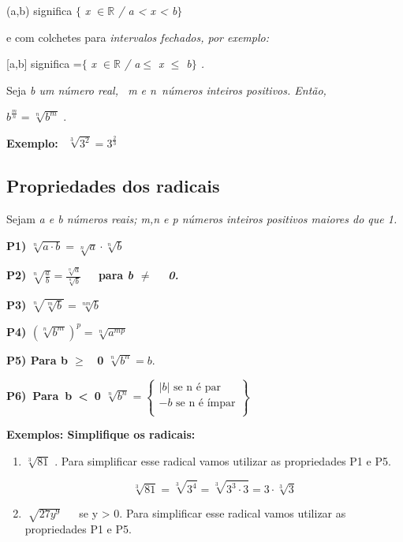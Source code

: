 (a,b) significa $ \{ $ \textit{ x \( \in \mathbb{R} \)  / a < x < b$ \} $ }

e com colchetes para \textit{intervalos fechados, por exemplo:}

[a,b] significa =$ \{ $ \textit{ x \( \in \mathbb{R} \)  / a$\leq$  x $\leq$  b$ \} $ .}

\begin{caixa}
	\begin{tdefinicao}

	Seja \textit{b um número real,~ m e n~números inteiros positivos.  Então,}

	\quad   \( b^{\frac{m}{n}}=\sqrt[n]{b^{m}} \) {\fontsize{14pt}{16.8pt}\selectfont .}
	\end{tdefinicao}
\end{caixa}
\textbf{Exemplo: \( ~~\sqrt[3]{3^{2}}=3^{\frac{2}{3}} \) ~ \qedsymbol{}}

\subsection{Propriedades dos radicais}

Sejam \textit{a e b números reais; m,n e p números inteiros positivos maiores do que 1.}

\textbf{P1)  \( \sqrt[n]{a \cdot b}=\sqrt[n]{a} \cdot \sqrt[n]{b} \) }

\textbf{P2)  \( \sqrt[n]{\frac{a}{b}}=\frac{\sqrt[n]{a}}{\sqrt[n]{b}} \) ~~para  \textit{b $ \neq $ ~ 0.}}

\textbf{P3)  \( \sqrt[n]{\sqrt[m]{b}}=\sqrt[nm]{b} \) }

\textbf{P4)  \(  \left( \sqrt[n]{b^{m}} \right) ^{p}=\sqrt[n]{a^{mp}} \) }

\textbf{P5) Para b $ \geq $ ~0    \( \sqrt[n]{b^{n}}=b . \) }

\textbf{P6)~Para~b~<~0       \( \sqrt[n]{b^{n}}= \left\{ \begin{matrix}
 \vert b \vert \textrm{ se n é par}\\
-b \textrm{ se n é ímpar} \\
\end{matrix} \right\}
 ~ \) }

\textbf{Exemplos: Simplifique os radicais:}

\begin{enumerate}
	\item  \( \sqrt[3]{81} \)  . Para simplificar esse radical vamos utilizar as propriedades P1 e P5.

 \[ \sqrt[3]{81}=\sqrt[3]{3^{4}}=\sqrt[3]{3^{3} \cdot 3}=3 \cdot \sqrt[3]{3} \] 

	\item  \( \sqrt[]{27y^{9}} \) ~~ se y > 0. Para simplificar esse radical vamos utilizar as propriedades P1 e P5.
\end{enumerate}

